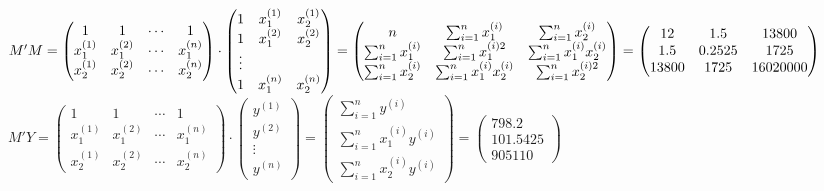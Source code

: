 \begin{enumerate}[label=\color{red}\arabic*),leftmargin=*]
\begin{enumerate}[label=\color{red}\alph*)]
	$M'M=\begin{pmatrix}
		1 & 1 & \cdots & 1\\
		x_1^{(1)} & x_1^{(2)} & \cdots & x_1^{(n)}\\
		x_2^{(1)} & x_2^{(2)} & \cdots & x_2^{(n)}
	\end{pmatrix}\cdot\begin{pmatrix}
		1 & x_1^{(1)} & x_2^{(1)}\\
		1 & x_1^{(2)} & x_2^{(2)}\\
		\vdots & & \\
		1 & x_1^{(n)} & x_2^{(n)}
	\end{pmatrix}=\begin{pmatrix}
		n & \sum_{i=1}^{n}x_1^{(i)} & \sum_{i=1}^{n}x_2^{(i)}\\
		\sum_{i=1}^{n}x_1^{(i)} & \sum_{i=1}^{n}x_1^{(i)2} & \sum_{i=1}^{n}x_1^{(i)}x_2^{(i)}\\
		\sum_{i=1}^{n}x_2^{(i)} & \sum_{i=1}^{n}x_1^{(i)}x_2^{(i)} & \sum_{i=1}^{n}x_2^{(i)2}
	\end{pmatrix}=\linebreak\begin{pmatrix}
		12 & 1.5 & 13800\\
		1.5 & 0.2525 & 1725\\
		13800 & 1725 & 16020000
	\end{pmatrix}$\\
	$M'Y=\begin{pmatrix}
		1 & 1 & \cdots & 1\\
		x_1^{(1)} & x_1^{(2)} & \cdots & x_1^{(n)}\\
		x_2^{(1)} & x_2^{(2)} & \cdots & x_2^{(n)}
	\end{pmatrix}\cdot\begin{pmatrix}
		y^{(1)}\\
		y^{(2)}\\
		\vdots\\
		y^{(n)}
	\end{pmatrix}=\begin{pmatrix}
		\sum_{i=1}^{n}y^{(i)}\\
		\sum_{i=1}^{n}x_1^{(i)}y^{(i)}\\
		\sum_{i=1}^{n}x_2^{(i)}y^{(i)}
	\end{pmatrix}=\begin{pmatrix}
		798.2\\
		101.5425\\
		905110
	\end{pmatrix}$
	

\end{enumerate}
\end{enumerate}
